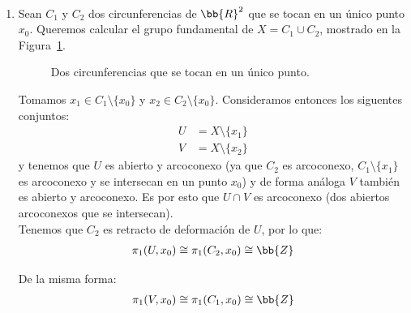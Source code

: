 \begin{ejemplo}\
    \begin{enumerate}
        \item Sean $C_1$ y $C_2$ dos circunferencias de $\bb{R}^2$ que se tocan en un único punto $x_0$. Queremos calcular el grupo fundamental de $X=C_1\cup C_2$, mostrado en la Figura~\ref{fig:dos_circunferencias}.
        \begin{figure}[ht]
            \centering
            \caption{Dos circunferencias que se tocan en un único punto.}
            \label{fig:dos_circunferencias}
        \end{figure}

        Tomamos $x_1\in C_1\setminus\{x_0\}$ y $x_2\in C_2 \setminus \{x_0\}$. Consideramos entonces los siguentes conjuntos:
        \begin{align*}
            U&=X\setminus \{x_1\} \\
            V &= X \setminus \{x_2\}
        \end{align*}
        y tenemos que $U$ es abierto y arcoconexo (ya que $C_2$ es arcoconexo, $C_1\setminus \{x_1\}$ es arcoconexo y se intersecan en un punto $x_0$) y de forma análoga $V$ también es abierto y arcoconexo. Es por esto que $U\cap V$ es arcoconexo (dos abiertos arcoconexos que se intersecan).\\

        Tenemos que $C_2$ es retracto de deformación de $U$, por lo que:
        \begin{gather*}
            \pi_1(U,x_0) \cong \pi_1(C_2,x_0) \cong \bb{Z}
        \end{gather*}

        De la misma forma: 
        \begin{gather*}
            \pi_1(V,x_0) \cong \pi_1(C_1,x_0) \cong \bb{Z}
        \end{gather*}


\end{enumerate}
\end{ejemplo}
